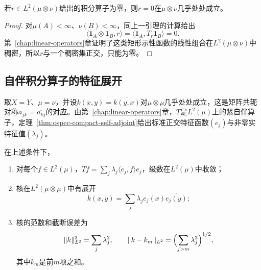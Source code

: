 \begin{lemma}[核由算子唯一确定]
\label{lem:ospec-kernel-unique}
若$r\in L^2(\mu\otimes\nu)$给出的积分算子为零，则$r=0$在$\mu\otimes\nu$几乎处处成立。
\end{lemma}

\begin{proof}
对$\mu(A)<\infty$、$\nu(B)<\infty$，同上一引理的计算给出
\[
\langle\mathbf 1_A\otimes\mathbf 1_B,r\rangle=\langle\mathbf 1_A,T_r\mathbf 1_B\rangle=0.
\]
第~\ref{chap:linear-operators}章证明了这类矩形示性函数的线性组合在$L^2(\mu\otimes\nu)$中稠密，所以$r$与一个稠密集正交，只能为零。
\end{proof}

\subsection{自伴积分算子的特征展开}
\label{sec:ospec-self-adjoint-kernel}

取$X=Y$、$\mu=\nu$，并设$k(x,y)=\overline{k(y,x)}$对$\mu\otimes\mu$几乎处处成立，这是矩阵共轭对称$a_{jk}=\overline{a_{kj}}$的对应。由第~\ref{chap:linear-operators}章，$T$是$L^2(\mu)$上的紧自伴算子，定理~\ref{thm:ospec-compact-self-adjoint}给出标准正交特征函数$(e_j)$与非零实特征值$(\lambda_j)$。

\begin{theorem}[自伴积分算子的特征展开]
\label{thm:ospec-self-adjoint-kernel}
在上述条件下，
\begin{enumerate}
\item 对每个$f\in L^2(\mu)$，$Tf=\sum_j\lambda_j\langle e_j,f\rangle e_j$，级数在$L^2(\mu)$中收敛；
\item 核在$L^2(\mu\otimes\mu)$中有展开
\begin{equation}
k(x,y)=\sum_j\lambda_je_j(x)\overline{e_j(y)} ;
\label{eq:ospec-kernel-eigen-expansion}
\end{equation}
\item 核的范数和截断误差为
\begin{equation}
\lVert k\rVert_{L^2}^2=\sum_j\lambda_j^2,\qquad\lVert k-k_m\rVert_{L^2}=\Bigl(\sum_{j>m}\lambda_j^2\Bigr)^{1/2},
\label{eq:ospec-kernel-eigen-norm}
\end{equation}
其中$k_m$是前$m$项之和。
\end{enumerate}
\end{theorem}

